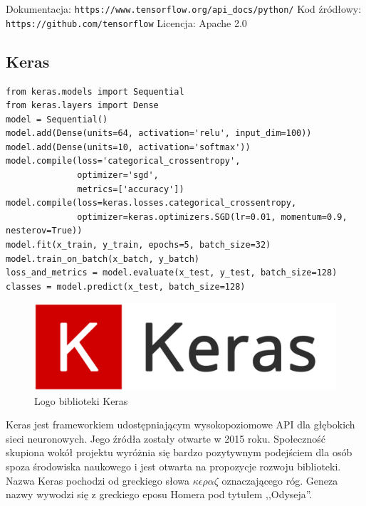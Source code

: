 \documentclass[12pt,a4paper,twoside,titlepage,openright]{book}
\begin{document}
\begin{itemize}
\noindent
\newline 
Dokumentacja: \texttt{https://www.tensorflow.org/api\_docs/python/}
\newline 
Kod źródłowy: \texttt{https://github.com/tensorflow}
\newline 
Licencja: Apache 2.0

\subsection{Keras}


\noindent
\begin{minipage}{\linewidth}
\begin{lstlisting}[caption=Skrypt najprostszego modelu sekwencyjnego (Keras w 30 sekund), label=lst:test]
from keras.models import Sequential
from keras.layers import Dense
model = Sequential()
model.add(Dense(units=64, activation='relu', input_dim=100))
model.add(Dense(units=10, activation='softmax'))
model.compile(loss='categorical_crossentropy',
              optimizer='sgd',
              metrics=['accuracy'])
model.compile(loss=keras.losses.categorical_crossentropy,
              optimizer=keras.optimizers.SGD(lr=0.01, momentum=0.9, nesterov=True))
model.fit(x_train, y_train, epochs=5, batch_size=32)
model.train_on_batch(x_batch, y_batch)
loss_and_metrics = model.evaluate(x_test, y_test, batch_size=128)
classes = model.predict(x_test, batch_size=128)
\end{lstlisting}
\end{minipage}

\begin{figure}[ht]
	\centering
			\includegraphics[resolution=100, scale=0.3]{Keras.png}
		\caption{Logo biblioteki Keras}
\end{figure}

Keras jest frameworkiem udostępniającym wysokopoziomowe API dla głębokich sieci neuronowych. Jego źródła zostały otwarte w 2015 roku. Społeczność skupiona wokół projektu wyróżnia się bardzo pozytywnym podejściem dla osób spoza środowiska naukowego i jest otwarta na propozycje rozwoju biblioteki. Nazwa Keras pochodzi od greckiego słowa \(\kappa\epsilon\rho\alpha\zeta\) oznaczającego róg. Geneza nazwy wywodzi się z greckiego eposu Homera pod tytułem ,,Odyseja''.


\end{itemize}
\end{document}
